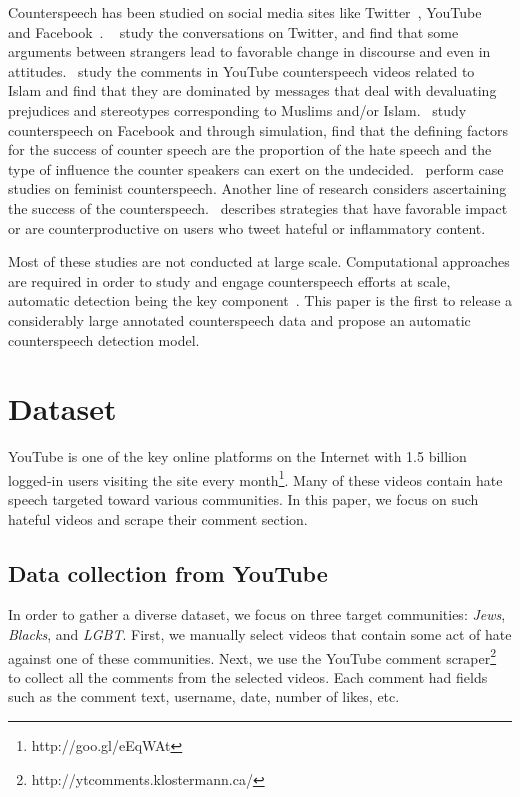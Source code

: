 \documentclass[11pt,a4paper]{article}
\begin{document}
{{Counterspeech has been studied on social media sites like Twitter~\cite{wright2017vectors, susan2016counterspeech}, YouTube~\cite{ernst2017hate} and Facebook~\cite{schieb2016governing}. ~\citet{wright2017vectors} study the conversations on Twitter, and find that some arguments between strangers lead to favorable change in discourse and even in attitudes.~\citet{ernst2017hate} study the comments in YouTube counterspeech videos related to Islam and find that they are dominated by messages that deal with devaluating prejudices and stereotypes corresponding to Muslims and/or Islam.~\citet{schieb2016governing} study counterspeech on Facebook and through simulation, find that the defining factors for the success of counter speech are the proportion of the hate speech and the type of influence the counter speakers can exert on the undecided.~\citet{Stroud2018feminist} perform case studies on feminist counterspeech. Another line of research considers ascertaining the success of the counterspeech.~\citet{susan2016successfullcounter} describes strategies that have favorable impact or are counterproductive on users who tweet hateful or inflammatory content. 

Most of these studies are not conducted at large scale. Computational approaches are required in order to study and engage counterspeech efforts at scale, automatic detection being the key component~\cite{wright2017vectors}. This paper is the first to release a considerably large annotated counterspeech data and propose an automatic counterspeech detection model.

\section{Dataset}

YouTube is one of the key online platforms on the Internet with 1.5 billion logged-in users visiting the site every month\footnote{http://goo.gl/eEqWAt}. Many of these videos contain hate speech targeted toward various communities. In this paper, we focus on such hateful videos and scrape their comment section.

\subsection{Data collection from YouTube}
In order to gather a diverse dataset, we focus on three target communities: {\sl Jews}, {\sl Blacks}, and {\sl LGBT}. First, we manually select videos that contain some act of hate against one of these communities. \iffalse{}These videos include acts of hatespeech, violence against target community, etc.\fi Next, we use the YouTube comment scraper\footnote{http://ytcomments.klostermann.ca/} to collect all the comments from the selected videos. Each comment had fields such as the comment text, username, date, number of likes, etc. 


}}
\end{document}
